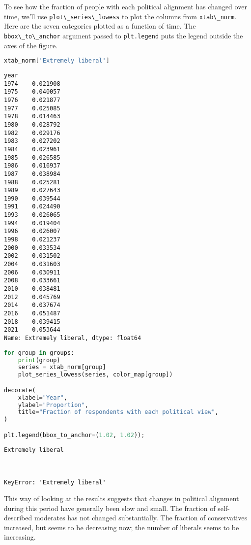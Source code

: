 To see how the fraction of people with each political alignment has
changed over time, we'll use
\passthrough{\lstinline!plot\_series\_lowess!} to plot the columns from
\passthrough{\lstinline!xtab\_norm!}. Here are the seven categories
plotted as a function of time. The
\passthrough{\lstinline!bbox\_to\_anchor!} argument passed to
\passthrough{\lstinline!plt.legend!} puts the legend outside the axes of
the figure.

\begin{lstlisting}[language=Python,style=source]
xtab_norm['Extremely liberal']
\end{lstlisting}

\begin{lstlisting}[style=output]
year
1974    0.021908
1975    0.040057
1976    0.021877
1977    0.025085
1978    0.014463
1980    0.028792
1982    0.029176
1983    0.027202
1984    0.023961
1985    0.026585
1986    0.016937
1987    0.038984
1988    0.025281
1989    0.027643
1990    0.039544
1991    0.024490
1993    0.026065
1994    0.019404
1996    0.026007
1998    0.021237
2000    0.033534
2002    0.031502
2004    0.031603
2006    0.030911
2008    0.033661
2010    0.038481
2012    0.045769
2014    0.037674
2016    0.051487
2018    0.039415
2021    0.053644
Name: Extremely liberal, dtype: float64
\end{lstlisting}

\begin{lstlisting}[language=Python,style=source]
for group in groups:
    print(group)
    series = xtab_norm[group]
    plot_series_lowess(series, color_map[group])

decorate(
    xlabel="Year",
    ylabel="Proportion",
    title="Fraction of respondents with each political view",
)

plt.legend(bbox_to_anchor=(1.02, 1.02));
\end{lstlisting}

\begin{lstlisting}[style=output]
Extremely liberal



KeyError: 'Extremely liberal'
\end{lstlisting}

This way of looking at the results suggests that changes in political
alignment during this period have generally been slow and small. The
fraction of self-described moderates has not changed substantially. The
fraction of conservatives increased, but seems to be decreasing now; the
number of liberals seems to be increasing.

